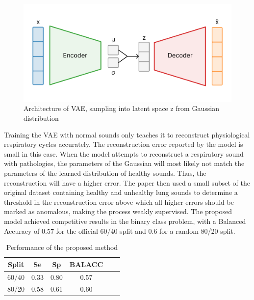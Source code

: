 \begin{figure}[h!]
    \includegraphics[width=\linewidth]{images/vae}
    \caption{
    Architecture of VAE, sampling into latent space z from Gaussian distribution
}
\end{figure}


Training the VAE with normal sounds only teaches it to reconstruct physiological respiratory cycles accurately. The reconstruction error reported by the model is small in this case. When the model attempts to reconstruct a respiratory sound with pathologies, the parameters of the Gaussian will most likely not match the parameters of the learned distribution of healthy sounds. Thus, the reconstruction will have a higher error. The paper then used a small subset of the original dataset containing healthy and unhealthy lung sounds to determine a threshold in the reconstruction error above which all higher errors should be marked as anomalous, making the process weakly supervised. The proposed model achieved competitive results in the binary class problem, with a Balanced Accuracy of 0.57 for the official 60/40 split and 0.6 for a random 80/20 split.

\begin{table}[h!]
    \centering
    \caption{Performance of the proposed method}
    \begin{tabular}{cccccc}
    \toprule
    \textbf{Split} & \textbf{Se} & \textbf{Sp} & \textbf{BALACC} \\
    \midrule
    60/40 & 0.33 & 0.80 & 0.57 \\
    80/20 & 0.58 & 0.61 & 0.60 \\
    \bottomrule
    \end{tabular}
\end{table}


